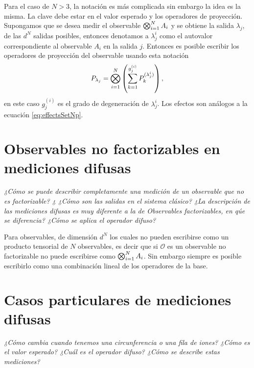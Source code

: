 \documentclass[12pt,oneside]{book}\raggedbottom{}
\begin{document}
Para el caso de $N>3$, la notación es más complicada sin embargo la idea es la misma. La clave debe estar en el valor esperado y los operadores de proyección.  Supongamos que se desea medir el observable $\bigotimes_{i=1}^{N} A_i$ y se obtiene la salida $\lambda_j$, de las $d^{N}$ salidas posibles, entonces denotamos a $\lambda_{j}^{i}$ como el autovalor correspondiente al observable $A_i$ en la salida $j$. Entonces es posible escribir los operadores de proyección del observable usando esta notación \[P_{\lambda_j}=\bigotimes_{i=1}^{N} \left(\sum_{k=1}^{g_{j}^{(i)}} P_k^{(\lambda_j^{i})}\right),\] en este caso $g_j^{(i)}$  es el grado de degeneración de $\lambda_{j}^{i}$. Los efectos son análogos a la ecuación {\eqref{eq:effectsSetNp}}.

\section*{Observables no factorizables en mediciones difusas}
\textit{¿Cómo se puede describir completamente una medición de un observable que no es factorizable? ¿ ¿Cómo son las salidas en el sistema clásico? ¿La descripción de las mediciones difusas es muy diferente a la de Observables factorizables, en qúe se diferencia? ¿Cómo se aplica el operador difuso?}

Para observables, de dimensión $d^N$ los cuales no pueden escribirse como un producto tensorial de $N$ observables, es decir que si $\mathcal{O}$ es un observable no factorizable no puede escribirse como $\bigotimes_{i=1}^{N} A_i$. Sin embargo siempre es posible escribirlo como una combinación lineal de los operadores de la base.  

\section*{Casos particulares de mediciones difusas}

\textit{¿Cómo cambia cuando tenemos una circunferencia o una fila de iones? ¿Cómo es el valor esperado? ¿Cuál es el operador difuso? ¿Cómo se describe estas mediciones? }
\end{document}
